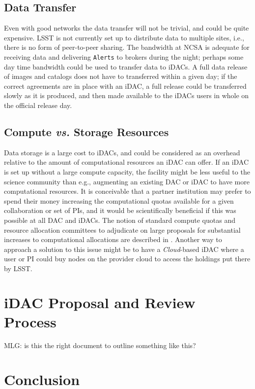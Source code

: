 \subsection{Data Transfer}
Even with good networks the data transfer will not be trivial, and could be quite expensive. LSST is not currently set up to distribute data to multiple sites, i.e., there is no form of peer-to-peer sharing. The bandwidth at NCSA is adequate for receiving data and delivering {\tt Alerts} to brokers during the night; perhaps some day time bandwidth could be used to transfer data to iDACs. A full data release of images and catalogs does not have to transferred within a given day; if the correct agreements are in place with an iDAC, a full release could be transferred slowly as it is produced, and then made available to the iDACs users in whole on the official release day.

\subsection{Compute {\it vs.} Storage Resources}
Data storage is a large cost to iDACs, and could be considered as an overhead relative to the amount of computational resources an iDAC can offer. If an iDAC is set up without a large compute capacity, the facility might be less useful to the science community than e.g., augmenting an existing DAC or iDAC to have more computational resources. It is conceivable that a partner institution may prefer to spend their money increasing the computational quotas available for a given collaboration or set of PIs, and it would be scientifically beneficial if this was possible at all DAC and iDACs. The notion of standard compute quotas and resource allocation committees to adjudicate on large proposals for substantial increases to computational allocations are described in . Another way to approach a solution to this issue might be to have a \emph{Cloud}-based iDAC where a user or PI could buy nodes on the provider cloud to access the holdings put there by LSST.

\section{iDAC Proposal and Review Process}

{MLG: is this the right document to outline something like this?}

\section{Conclusion}
